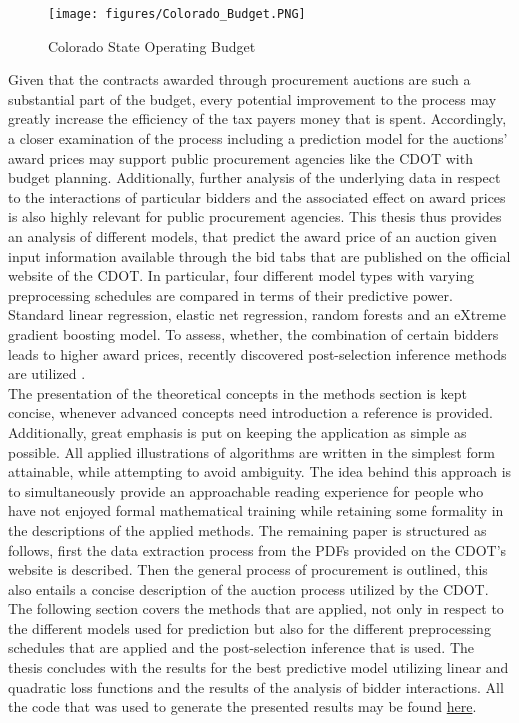 \documentclass[a4paper,12pt, headsepline]{scrartcl}
\numberwithin{equation}{section}
\begin{document}
\begin{figure}[H]
	\texttt{[image: figures/Colorado\_Budget.PNG]}
	\caption{Colorado State Operating Budget \citep{ColoradoBudget}}\label{fig:bud}
\end{figure}

Given that the contracts awarded through procurement auctions are such a substantial part of the budget, every potential improvement to the process may greatly increase the efficiency of the tax payers money that is spent. Accordingly, a closer examination of the process including a prediction model for the auctions' award prices may support public procurement agencies like the CDOT with budget planning. Additionally, further analysis of the underlying data in respect to the interactions of particular bidders and the associated effect on award prices is also highly relevant for public procurement agencies. This thesis thus provides an analysis of different models, that predict the award price of an auction given input information available through the bid tabs that are published on the official website of the CDOT. In particular, four different model types with varying preprocessing schedules are compared in terms of their predictive power. Standard linear regression, elastic net regression, random forests and an eXtreme gradient boosting model. To assess, whether, the combination of certain bidders leads to higher award prices, recently discovered post-selection inference methods are utilized \citep{selectiveInference}.\\
The presentation of the theoretical concepts in the methods section is kept concise, whenever advanced concepts need introduction a reference is provided. Additionally, great emphasis is put on keeping the application as simple as possible. All applied illustrations of algorithms are written in the simplest form attainable, while attempting to avoid ambiguity. The idea behind this approach is to simultaneously provide an approachable reading experience for people who have not enjoyed formal mathematical training while retaining some formality in the descriptions of the applied methods.
The remaining paper is structured as follows, first the data extraction process from the PDFs provided on the CDOT's website is described. Then the general process of procurement is outlined, this also entails a concise description of the auction process utilized by the CDOT. The following section covers the methods that are applied, not only in respect to the different models used for prediction but also for the different preprocessing schedules that are applied and the post-selection inference that is used. The thesis concludes with the results for the best predictive model utilizing linear and quadratic loss functions and the results of the analysis of bidder interactions. All the code that was used to generate the presented results may be found \href{https://github.com/Base-R-Best-R/Auction}{here}.
\newpage
\end{document}
